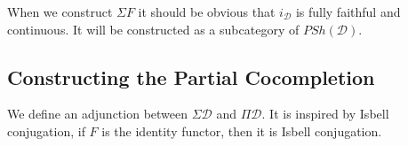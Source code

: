 \documentclass[12pt]{article} %
\theoremstyle{definition}
\theoremstyle{definition}
\theoremstyle{definition}
\theoremstyle{definition}
\begin{document}
When we construct $\Sigma F$ it should be obvious that $i_\mathcal{D}$ is fully faithful and continuous. It will be constructed
as a subcategory of $PSh(\mathcal{D})$.

\subsection{Constructing the Partial Cocompletion}

We define an adjunction between $\Sigma \mathcal{D}$ and $\Pi \mathcal{D}$. It is inspired by Isbell conjugation, if $F$ is the 
identity functor, then it is Isbell conjugation.
\end{document}
